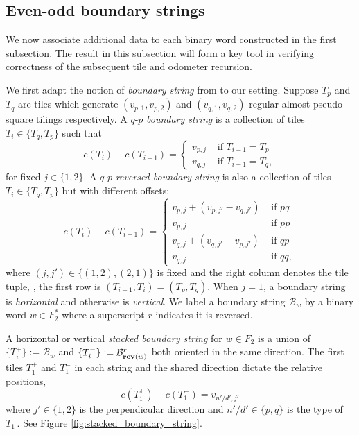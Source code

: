 \documentclass[12pt]{amsart}
\begin{document}
\subsection{Even-odd boundary strings}
We now associate additional data to each binary word constructed in the first subsection. The result in this subsection
will form a key tool in verifying correctness of the subsequent tile and odometer recursion. 

We first adapt the notion of {\it boundary string} from \cite{levine2017apollonian} to our setting.
Suppose $T_p$ and $T_q$ are tiles which generate $(v_{p,1},v_{p,2})$ and $(v_{q,1}, v_{q,2})$ 
regular almost pseudo-square tilings respectively. A $q$-$p$ {\it boundary string}
is a collection of tiles $T_i \in \{T_q,T_p\}$ such that
\begin{equation} \label{eq:boundary_string_left_to_right}
c(T_i) - c(T_{i-1}) = \begin{cases}
v_{p,j} &\mbox{ if $T_{i-1} = T_p$} \\
v_{q,j} &\mbox{ if $T_{i-1} = T_q$},
\end{cases}
\end{equation}
for fixed $j \in \{1, 2\}$. A $q$-$p$ {\it reversed boundary-string} is also a collection of tiles $T_i \in \{T_q,T_p\}$ 
but with different offsets:
\begin{equation} \label{eq:boundary_string_left_to_right_reversed}
c(T_i) - c(T_{i-1}) = \begin{cases}
v_{p,j} + (v_{p,j'} - v_{q,j'}) &\mbox{ if $pq$} \\
v_{p,j} &\mbox{ if $pp$} \\
v_{q,j} + (v_{q,j'} - v_{p,j'}) &\mbox{ if $qp$} \\
v_{q,j} &\mbox{ if $qq$},
\end{cases}
\end{equation}
where $(j,j') \in \{ (1,2), (2,1)\}$ is fixed and the right column denotes the tile tuple, \eg, the first row is $(T_{i-1}, T_i) = (T_p, T_q)$. When $j=1$, a boundary string is {\it horizontal} and otherwise is {\it vertical}. We label 
a boundary string $\mathcal{B}_{w}$ by a binary word $w \in F_2^*$ where a superscript $r$ indicates it is reversed. 

A horizontal or vertical {\it stacked boundary string} for $w \in F_2$ is a union of $\{T_i^+\} := \mathcal{B}_w$ and $\{T_i^-\} := \mathcal{B}^r_{\mathop{\bf rev}(w)}$ both oriented in the same direction. The first tiles $T_1^+$ and $T_1^-$ in each string and the shared direction dictate the relative positions,
\begin{equation} \label{eq:stacked_boundary_string}
c(T_1^+) - c(T_1^-) = v_{n'/d', j'}
\end{equation}
where $j' \in \{1,2\}$ is the perpendicular direction and $n'/d' \in \{p,q\}$ is the type of $T_1^-$. See Figure \ref{fig:stacked_boundary_string}.
\end{document}
